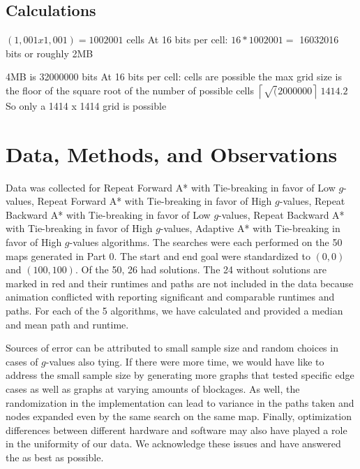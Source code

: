 \documentclass[a4paper,12pt]{article}
\begin{document}
\subsection{Calculations}
$(1,001 x 1,001) = 1002001$ cells \newline
At 16 bits per cell: \newline
$16 * 1002001  = $ 16032016 bits or roughly 2MB \newline \newline

4MB  is 32000000 bits \newline
At 16 bits per cell:  cells are possible \newline 
	the max grid size is the floor of the square root of the number of possible cells \newline
	$\left \lceil{\sqrt(2000000}\right \rceil ~1414.2$ \newline 
	So only a 1414 x 1414 grid is possible

\section{Data, Methods, and Observations}

Data was collected for Repeat Forward A* with Tie-breaking in favor of Low $g$-values, Repeat Forward A* with Tie-breaking in favor of High $g$-values,  Repeat Backward A* with Tie-breaking in favor of Low $g$-values, Repeat Backward A* with Tie-breaking in favor of High $g$-values, Adaptive A* with Tie-breaking in favor of High $g$-values algorithms. The searches were each performed on the 50 maps generated in Part 0. The start and end goal were standardized to $(0,0)$ and $(100,100)$. Of the 50, 26 had solutions. The 24 without solutions are marked in red and their runtimes and paths are not included in the data because animation conflicted with reporting significant and comparable runtimes and paths. For each of the 5 algorithms, we have calculated and provided a median and mean path and runtime. 

Sources of error can be attributed to small sample size and random choices in cases of $g$-values also tying. If there were more time, we would have like to address the small sample size by generating more graphs that tested specific edge cases as well as graphs at varying amounts of blockages. As well, the randomization in the implementation can lead to variance in the paths taken and nodes expanded even by the same search on the same map. Finally, optimization differences between different hardware and software may also have played a role in the uniformity of our data. We acknowledge these issues and have answered the as best as possible. 
\end{document}
